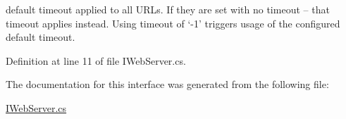 default timeout applied to all U\+R\+Ls. If they are set with no timeout – that timeout applies instead. Using timeout of ‘-\/1’ triggers usage of the configured default timeout. 



Definition at line 11 of file I\+Web\+Server.\+cs.



The documentation for this interface was generated from the following file\+:\begin{DoxyCompactItemize}
\item 
\mbox{\hyperlink{_i_web_server_8cs}{I\+Web\+Server.\+cs}}\end{DoxyCompactItemize}
